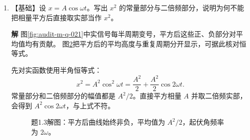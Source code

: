\documentclass[11pt,openany,fontset=fandol]{ctexbook}
\theoremstyle{plain}\newtheorem{theorem}{定理}[chapter]\newtheorem{proposition}[theorem]{命题}
\theoremstyle{definition}\newtheorem{definition}{定义}[chapter]\newtheorem{example}{例}[chapter]
\theoremstyle{remark}\newtheorem*{remark}{说明}
\newcommand{\SolutionStart}{\par\nobreak\medskip\nobreak\noindent\textbf{解}\quad\ignorespaces}
\newenvironment{solution}{\SolutionStart}{\par\medskip}
\begin{document}
\begin{enumerate}[label=1.\arabic*]
\begin{solution}
以第一项为相位参考，合相量为
\[
X=2+2\ee^{2\pi\ii/3}
=2+2(-1/2+\sqrt3\ii/2)=1+\sqrt3\ii.
\]
其模为2，辐角为 $\pi/3$，因此 $x=2\cos(\omega t+\pi/3)$。原式初值为 $2+2\cos(2\pi/3)=1$，合成式为 $2\cos(\pi/3)=1$。

\begin{figure}[H]\centering
{}
\caption{题1.2解图：虚线补成平行四边形，粗箭头为合相量。合相位为 $+\pi/3$，实轴投影给出 $x(0)=1$。}\label{fig:ex-1-2}
\end{figure}

求导后，原式在0处为 $-2\omega\sin(2\pi/3)=-\sqrt3\omega$；合成式给出 $-2\omega\sin(\pi/3)$，两者相等。若把合相位误写成 $-\pi/3$，初始位移检查仍会通过，速度检查则会发现错误。

合相量指向第一象限，实轴投影为1。其随时间逆时针转动时，实投影初始减小，对应 $\dot x(0)<0$。
\end{solution}

\item \begin{minipage}[t]{\linewidth}
【基础】设 $x=A\cos\omega t$。写出 $x^2$ 的常量部分与二倍频部分，说明为何不能把相量平方后直接取实部当作 $x^2$。
\end{minipage}

\begin{solution}
图\ref{fig:audit-m-q-021}中实信号每半周期变号，平方后这些正、负部分对平均值均有贡献。
图\ref{fig:hw-1-3}把平方后的平均高度与重复周期分开显示，可据此核对恒等式。

先对实函数使用半角恒等式：
\[
x^2=A^2\cos^2\omega t=\frac{A^2}{2}+\frac{A^2}{2}\cos2\omega t.
\]
常量部分和二倍频部分的幅值都是 $A^2/2$。直接平方相量 $A$ 并取二倍频实部，会得到 $A^2\cos2\omega t$，与上式不符。

\begin{figure}[H]\centering
{}
\caption{题1.3解图：平方后曲线始终非负，平均值为 $A^2/2$，起伏角频率为 $2\omega$。}\label{fig:hw-1-3}
\end{figure}


\end{solution}
\end{enumerate}
\end{document}
